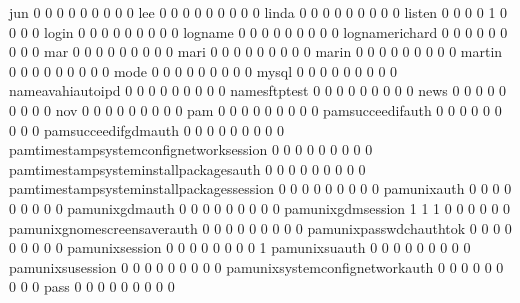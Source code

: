 \documentclass[compress,8pt]{beamer}
\begin{document}
\begin{frame}
\begin{Schunk}
  jun                                        0   0   0   0   0   0   0   0   0
  lee                                        0   0   0   0   0   0   0   0   0
  linda                                      0   0   0   0   0   0   0   0   0
  listen                                     0   0   0   0   1   0   0   0   0
  login                                      0   0   0   0   0   0   0   0   0
  logname                                    0   0   0   0   0   0   0   0   0
  lognamerichard                             0   0   0   0   0   0   0   0   0
  mar                                        0   0   0   0   0   0   0   0   0
  mari                                       0   0   0   0   0   0   0   0   0
  marin                                      0   0   0   0   0   0   0   0   0
  martin                                     0   0   0   0   0   0   0   0   0
  mode                                       0   0   0   0   0   0   0   0   0
  mysql                                      0   0   0   0   0   0   0   0   0
  nameavahiautoipd                           0   0   0   0   0   0   0   0   0
  namesftptest                               0   0   0   0   0   0   0   0   0
  news                                       0   0   0   0   0   0   0   0   0
  nov                                        0   0   0   0   0   0   0   0   0
  pam                                        0   0   0   0   0   0   0   0   0
  pamsucceedifauth                           0   0   0   0   0   0   0   0   0
  pamsucceedifgdmauth                        0   0   0   0   0   0   0   0   0
  pamtimestampsystemconfignetworksession     0   0   0   0   0   0   0   0   0
  pamtimestampsysteminstallpackagesauth      0   0   0   0   0   0   0   0   0
  pamtimestampsysteminstallpackagessession   0   0   0   0   0   0   0   0   0
  pamunixauth                                0   0   0   0   0   0   0   0   0
  pamunixgdmauth                             0   0   0   0   0   0   0   0   0
  pamunixgdmsession                          1   1   1   0   0   0   0   0   0
  pamunixgnomescreensaverauth                0   0   0   0   0   0   0   0   0
  pamunixpasswdchauthtok                     0   0   0   0   0   0   0   0   0
  pamunixsession                             0   0   0   0   0   0   0   0   1
  pamunixsuauth                              0   0   0   0   0   0   0   0   0
  pamunixsusession                           0   0   0   0   0   0   0   0   0
  pamunixsystemconfignetworkauth             0   0   0   0   0   0   0   0   0
  pass                                       0   0   0   0   0   0   0   0   0

\end{Schunk}
\end{frame}
\end{document}
